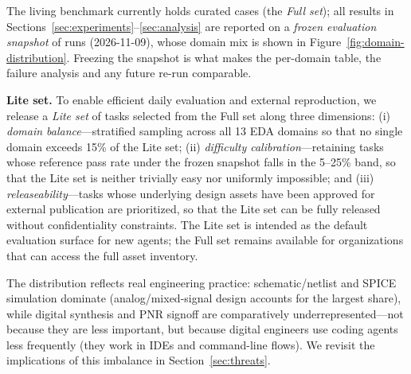 The living benchmark currently holds \Ntasks{} curated cases (the \emph{Full set}); all results in
Sections~\ref{sec:experiments}--\ref{sec:analysis} are reported on a \emph{frozen
evaluation snapshot} of \Neval{} runs (2026-11-09), whose domain mix is shown in
Figure~\ref{fig:domain-distribution}. Freezing the snapshot is what makes the
per-domain table, the failure analysis and any future re-run comparable.

\textbf{Lite set.} To enable efficient daily evaluation and external reproduction,
we release a \emph{Lite set} of \LiteSet{} tasks selected from the Full set along
three dimensions: (i) \emph{domain balance}---stratified sampling across all 13
EDA domains so that no single domain exceeds 15\% of the Lite set; (ii)
\emph{difficulty calibration}---retaining tasks whose reference pass rate under
the frozen snapshot falls in the 5--25\% band, so that the Lite set is neither
trivially easy nor uniformly impossible; and (iii) \emph{releaseability}---tasks
whose underlying design assets have been approved for external publication are
prioritized, so that the Lite set can be fully released without confidentiality
constraints. The Lite set is intended as the default evaluation surface for new
agents; the Full set remains available for organizations that can access the
full asset inventory.

The distribution reflects real engineering practice: schematic/netlist and SPICE simulation dominate (analog/mixed-signal design accounts for the largest share), while digital synthesis and PNR signoff are comparatively underrepresented---not because they are less important, but because digital engineers use coding agents less frequently (they work in IDEs and command-line flows). We revisit the implications of this imbalance in Section~\ref{sec:threats}.

